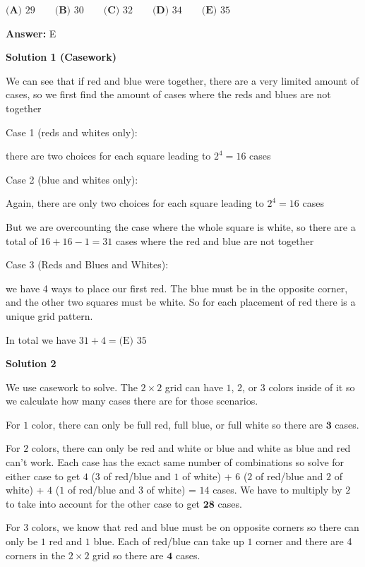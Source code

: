 \begin{enumerate}
 $\textbf{(A) } 29 \qquad \textbf{(B) } 30 \qquad \textbf{(C) } 32 \qquad \textbf{(D) } 34 \qquad \textbf{(E) } 35$

 \textbf{Answer: }E



\textbf{Solution 1 (Casework)}

We can see that if red and blue were together, there are a very limited amount of cases, so we first find the amount of cases where the reds and blues are not together

 Case 1 (reds and whites only):

 there are two choices for each square leading to $2^4=16$ cases

 Case 2 (blue and whites only):

 Again, there are only two choices for each square leading to $2^4=16$ cases

 But we are overcounting the case where the whole square is white, so there are a total of $16+16-1=31$ cases where the red and blue are not together

 Case 3 (Reds and Blues and Whites):

 we have 4 ways to place our first red. The blue must be in the opposite corner, and the other two squares must be white. So for each placement of red there is a unique grid pattern.

 In total we have $31+4=\boxed{\text{(E) }35}$




\textbf{Solution 2}

We use casework to solve. The $2 \times 2$ grid can have $1$, $2$, or $3$ colors inside of it so we calculate how many cases there are for those scenarios. 

 For $1$ color, there can only be full red, full blue, or full white so there are $\textbf{3}$ cases. 

 For $2$ colors, there can only be red and white or blue and white as blue and red can't work. Each case has the exact same number of combinations so solve for either case to get $4$ ($3$ of red/blue and $1$ of white) + $6$ ($2$ of red/blue and $2$ of white) + $4$ ($1$ of red/blue and $3$ of white) = $14$ cases. We have to multiply by $2$ to take into account for the other case to get $\textbf{28}$ cases.

 For $3$ colors, we know that red and blue must be on opposite corners so there can only be $1$ red and $1$ blue. Each of red/blue can take up $1$ corner and there are 4 corners in the $2 \times 2$ grid so there are $\textbf{4}$ cases.


\end{enumerate}
